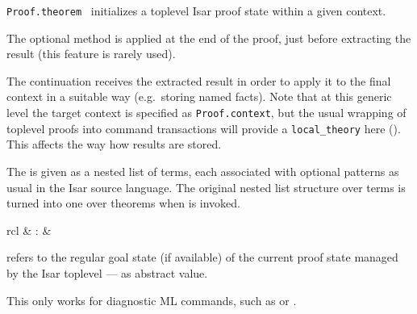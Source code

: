\begin{isabellebody}
\begin{isamarkuptext}
\begin{description}
  \item \verb|Proof.theorem|~
  initializes a toplevel Isar proof state within a given context.

  The optional  method is applied at the end of
  the proof, just before extracting the result (this feature is rarely
  used).

  The  continuation receives the extracted result
  in order to apply it to the final context in a suitable way (e.g.\
  storing named facts).  Note that at this generic level the target
  context is specified as \verb|Proof.context|, but the usual
  wrapping of toplevel proofs into command transactions will provide a
  \verb|local_theory| here (\chref{ch:local-theory}).  This
  affects the way how results are stored.

  The  is given as a nested list of terms, each
  associated with optional \hyperlink{keyword.is}{\mbox{}} patterns as usual in the
  Isar source language.  The original nested list structure over terms
  is turned into one over theorems when  is
  invoked.

  \end{description}%
\end{isamarkuptext}%
\isamarkuptrue%
%
\endisatagmlref
{\isafoldmlref}%
%
\isadelimmlref
%
\endisadelimmlref
%
\isadelimmlantiq
%
\endisadelimmlantiq
%
\isatagmlantiq
%
\begin{isamarkuptext}%
\begin{matharray}{rcl}
  \hypertarget{ML antiquotation.Isar.goal}{\hyperlink{ML antiquotation.Isar.goal}{\mbox{}}} & : &  \\
  \end{matharray}

  \begin{description}

  \item {} refers to the regular goal state (if
  available) of the current proof state managed by the Isar toplevel
  --- as abstract value.

  This only works for diagnostic ML commands, such as \hyperlink{command.ML-val}{\mbox{}} or \hyperlink{command.ML-command}{\mbox{}}.


\end{description}
\end{isamarkuptext}
\end{isabellebody}
